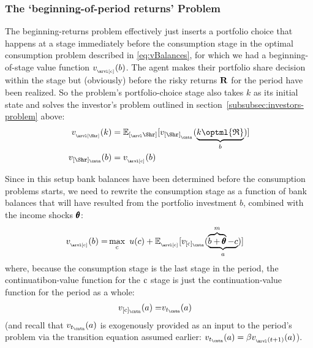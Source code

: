 \documentclass[titlepage, headings=optiontotocandhead]{Resources/texmf-local/tex/latex/econtex}
\begin{document}
\subsubsection{The `beginning-of-period returns' Problem}\label{subsubsec:beginning-returns}
The beginning-returns problem effectively just inserts a portfolio choice that happens at a {stage} immediately before the consumption {stage} in the optimal consumption problem described in \eqref{eq:vBalances}, for which we had a beginning-of-{stage} value function $v_{_\arvl[\cFunc]}(b)$.  The agent makes their portfolio share decision within the {stage} but (obviously) before the risky returns ${\mathbf{R}}$ for the {period} have been realized.  So the problem's portfolio-choice {stage} also takes $k$ as its initial state and solves the investor's problem outlined in section~\ref{subsubsec:investors-problem} above:
\begin{equation}\begin{gathered}\begin{aligned}
  v_{_\arvl[\Shr]}(k) & = \Ex_{[_\arvl\Shr]}[v_{[\Shr]_{_\cntn}}(\underbrace{k\optml{\Rport}}_{b})]
\\v_{[\Shr]_\cntn}(b)  & = v_{_\arvl[\cFunc]}(b)
    \end{aligned}\end{gathered}\end{equation}

Since in this setup bank balances have been determined before the consumption problems starts, we need to rewrite the consumption {stage}  as a function of bank balances that will have resulted from the portfolio investment $b$, combined with the income shocks $\pmb{\theta}$:
\begin{equation}\begin{gathered}\begin{aligned}
      v_{_\arvl[\cFunc]}(b) = & \max_{\cFunc}~ u(c) + \Ex_{_\arvl[\cFunc]}[v_{[\cFunc]_\cntn}(\underbrace{\overbrace{b+\TranShkEmp}^{m}-c}_{a})]
    \end{aligned}\end{gathered}\end{equation}
where, because the consumption {stage} is the last {stage} in the {period}, the continuatibon-value function for the $\mathrm{c}$ {stage} is just the continuation-value function for the period as a whole:
\begin{equation}\begin{gathered}\begin{aligned}
      v_{[\cFunc]_\cntn}(a) = & v_{t_\cntn}(a)
    \end{aligned}\end{gathered}\end{equation}
(and recall that $v_{t_\cntn}(a)$ is exogenously provided as an input to the {period}'s problem via the transition equation assumed earlier: $v_{t_\cntn}(a)=\beta v_{_\arvl(t+1)}(a)$).
\end{document}
